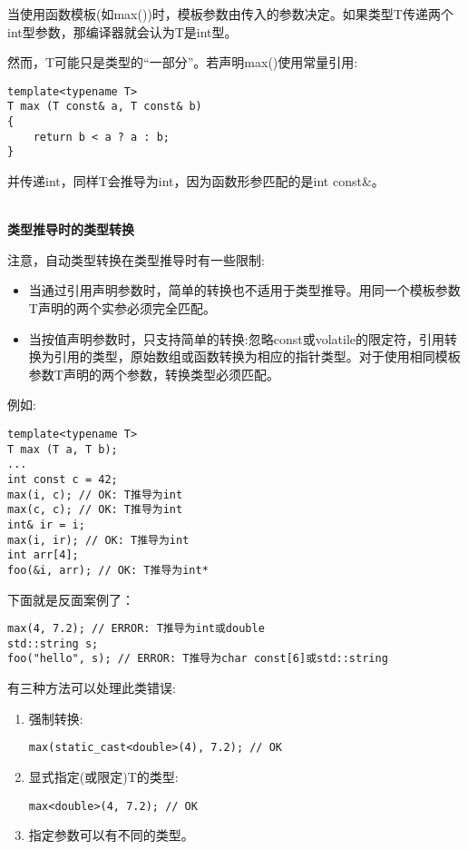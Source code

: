 当使用函数模板(如max())时，模板参数由传入的参数决定。如果类型T传递两个int型参数，那编译器就会认为T是int型。

然而，T可能只是类型的“一部分”。若声明max()使用常量引用:

\begin{lstlisting}[style=styleCXX]
template<typename T>
T max (T const& a, T const& b)
{
	return b < a ? a : b;
}
\end{lstlisting}

并传递int，同样T会推导为int，因为函数形参匹配的是int const\&。

\hspace*{\fill} \\ %
\noindent
\textbf{类型推导时的类型转换}

注意，自动类型转换在类型推导时有一些限制:

\begin{itemize}
\item
当通过引用声明参数时，简单的转换也不适用于类型推导。用同一个模板参数T声明的两个实参必须完全匹配。

\item
当按值声明参数时，只支持简单的转换:忽略const或volatile的限定符，引用转换为引用的类型，原始数组或函数转换为相应的指针类型。对于使用相同模板参数T声明的两个参数，转换类型必须匹配。
\end{itemize}

例如:

\begin{lstlisting}[style=styleCXX]
template<typename T>
T max (T a, T b);
...
int const c = 42;
max(i, c); // OK: T推导为int
max(c, c); // OK: T推导为int
int& ir = i;
max(i, ir); // OK: T推导为int
int arr[4];
foo(&i, arr); // OK: T推导为int*
\end{lstlisting}

下面就是反面案例了：

\begin{lstlisting}[style=styleCXX]
max(4, 7.2); // ERROR: T推导为int或double
std::string s;
foo("hello", s); // ERROR: T推导为char const[6]或std::string
\end{lstlisting}

有三种方法可以处理此类错误:

\begin{enumerate}
\item
强制转换:
\begin{lstlisting}[style=styleCXX]
max(static_cast<double>(4), 7.2); // OK
\end{lstlisting}

\item
显式指定(或限定)T的类型:
\begin{lstlisting}[style=styleCXX]
max<double>(4, 7.2); // OK
\end{lstlisting}

\item
指定参数可以有不同的类型。
\end{enumerate}

